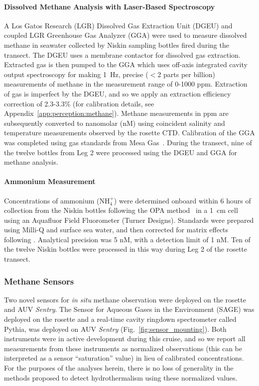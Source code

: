 \paragraph{Dissolved Methane Analysis with Laser-Based Spectroscopy}
A Los Gatos Research (LGR) Dissolved Gas Extraction Unit (DGEU) and coupled LGR Greenhouse Gas Analyzer (GGA) were used to measure dissolved methane in seawater collected by Niskin sampling bottles fired during the transect. The DGEU uses a membrane contactor for dissolved gas extraction. Extracted gas is then pumped to the GGA which uses off-axis integrated cavity output spectroscopy for making \SI{1}{\hertz}, precise ($<$2 parts per billion) measurements of methane in the measurement range of 0-1000 ppm. Extraction of gas is imperfect by the DGEU, and so we apply an extraction efficiency correction of 2.3-3.3\% (for calibration details, see Appendix~\ref{app:perception:methane}). Methane measurements in ppm are subsequently converted to nanomolar (nM) using coincident salinity and temperature measurements observed by the rosette CTD. Calibration of the GGA was completed using gas standards from Mesa Gas~\autocite{michel2021observations}. During the transect, nine of the twelve bottles from Leg 2 were processed using the DGEU and GGA for methane analysis.

\paragraph{Ammonium Measurement}
Concentrations of ammonium (NH$_4^+$) were determined onboard within 6 hours of collection from the Niskin bottles following the OPA method~\autocite{holmes1999simple} in a \SI{1}{\centi\meter} cell using an Aquafluor Field Fluorometer (Turner Designs). Standards were prepared using Milli-Q and surface sea water, and then corrected for matrix effects following \cite{taylor2007improving}. Analytical precision was 5 nM, with a detection limit of 1 nM. Ten of the twelve Niskin bottles were processed in this way during Leg 2 of the rosette transect.

\subsubsection{Methane Sensors}
Two novel sensors for \emph{in situ} methane observation were deployed on the rosette and AUV \emph{Sentry}. The Sensor for Aqueous Gases in the Environment (SAGE) was deployed on the rosette and a real-time cavity ringdown spectrometer called Pythia, was deployed on AUV \emph{Sentry} (Fig.~\ref{fig:sensor_mounting}). Both instruments were in active development during this cruise, and so we report all measurements from these instruments as normalized observations (this can be interpreted as a sensor ``saturation'' value) in lieu of calibrated concentrations. For the purposes of the analyses herein, there is no loss of generality in the methods proposed to detect hydrothermalism using these normalized values.

